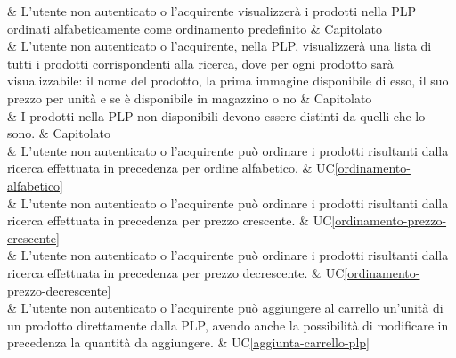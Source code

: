  & L'utente non autenticato o l'acquirente visualizzerà i prodotti nella PLP ordinati alfabeticamente come ordinamento predefinito & Capitolato \\

 & L'utente non autenticato o l'acquirente, nella PLP, visualizzerà una lista di tutti i prodotti corrispondenti alla ricerca, dove per ogni prodotto sarà visualizzabile: il nome del prodotto, la prima immagine disponibile di esso, il suo prezzo per unità e se è disponibile in magazzino o no & Capitolato \\

 & I prodotti nella PLP non disponibili devono essere distinti da quelli che lo sono. & Capitolato \\

 & L'utente non autenticato o l'acquirente può ordinare i prodotti risultanti dalla ricerca effettuata in precedenza per ordine alfabetico. & UC\ref{ordinamento-alfabetico} \\

 & L'utente non autenticato o l'acquirente può ordinare i prodotti risultanti dalla ricerca effettuata in precedenza per prezzo crescente. & UC\ref{ordinamento-prezzo-crescente} \\

 & L'utente non autenticato o l'acquirente può ordinare i prodotti risultanti dalla ricerca effettuata in precedenza per prezzo decrescente. & UC\ref{ordinamento-prezzo-decrescente} \\

 & L'utente non autenticato o l'acquirente può aggiungere al carrello un'unità di un prodotto direttamente dalla PLP, avendo anche la possibilità di modificare in precedenza la quantità da aggiungere. & UC\ref{aggiunta-carrello-plp} \\

